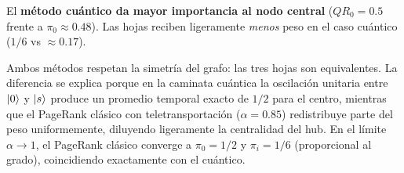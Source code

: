 El \textbf{método cuántico da mayor importancia al nodo central} ($QR_0 = 0.5$ frente a $\pi_0 \approx 0.48$). Las hojas reciben ligeramente \emph{menos} peso en el caso cuántico ($1/6$ vs $\approx 0.17$).

Ambos métodos respetan la simetría del grafo: las tres hojas son equivalentes. La diferencia se explica porque en la caminata cuántica la oscilación unitaria entre $\ket{0}$ y $\ket{s}$ produce un promedio temporal exacto de $1/2$ para el centro, mientras que el PageRank clásico con teletransportación ($\alpha = 0.85$) redistribuye parte del peso uniformemente, diluyendo ligeramente la centralidad del hub. En el límite $\alpha \to 1$, el PageRank clásico converge a $\pi_0 = 1/2$ y $\pi_i = 1/6$ (proporcional al grado), coincidiendo exactamente con el cuántico.